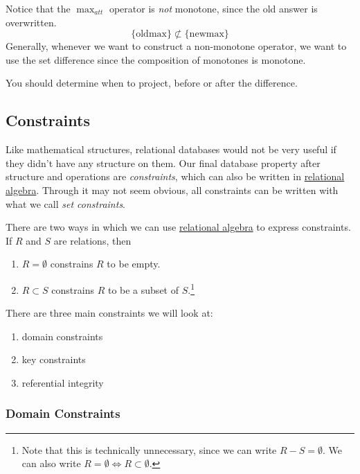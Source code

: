     Notice that the $\max_{att}$ operator is \textit{not} monotone, since the old answer is overwritten. 
    \begin{equation}
      \{\mathrm{old max}\} \not\subset \{\mathrm{new max}\}
    \end{equation}
    Generally, whenever we want to construct a non-monotone operator, we want to use the set difference since the composition of monotones is monotone. 

    You should determine when to project, before or after the difference. 

\subsection{Constraints} 

  Like mathematical structures, relational databases would not be very useful if they didn't have any structure on them. Our final database property after structure and operations are \textit{constraints}, which can also be written in \hyperref[def:relational-algebra]{relational algebra}. Through it may not seem obvious, all constraints can be written with what we call \textit{set constraints}. 

  \begin{definition}
    \label{def:set-constraints}
    There are two ways in which we can use \hyperref[def:relational-algebra]{relational algebra} to express constraints. If $R$ and $S$ are relations, then 
    \begin{enumerate}
      \item $R = \emptyset$ constrains $R$ to be empty.
      \item $R \subset S$ constrains $R$ to be a subset of $S$.\footnote{Note that this is technically unnecessary, since we can write $R - S = \emptyset$. We can also write $R = \emptyset \iff R \subset \emptyset$.}
    \end{enumerate}
  \end{definition} 

  There are three main constraints we will look at: 
  \begin{enumerate}
    \item domain constraints 
    \item key constraints 
    \item referential integrity
  \end{enumerate}

  \subsubsection{Domain Constraints}

